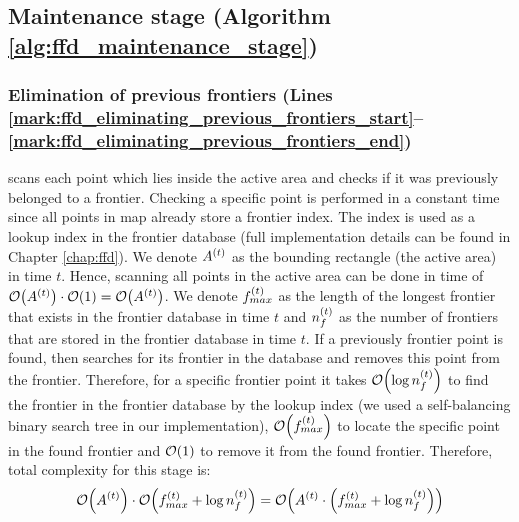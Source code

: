 \subsection{Maintenance stage (Algorithm \ref{alg:ffd_maintenance_stage})}
\subsubsection{Elimination of previous frontiers (Lines
\ref{mark:ffd_eliminating_previous_frontiers_start}--\ref{mark:ffd_eliminating_previous_frontiers_end})}
\FFD scans each point which lies inside the active area and checks if it was
previously belonged to a frontier. Checking a specific point is performed in a
constant time since all points in map already store a frontier index. The index
is used as a lookup index in the frontier database (full implementation details
can be found in Chapter \ref{chap:ffd}). We denote $A^{\left(t\right)}$ as the bounding
rectangle (the active area) in time $t$. Hence, scanning all points in the
active area can be done in time of $\mathcal{O}{\left(A^{\left(t\right)}\right)} \cdot \mathcal{O}{\left(1\right)} =
\mathcal{O}{\left(A^{\left(t\right)}\right)}$. We denote $f_{max}^{\left(t\right)}$ as the length of the
longest frontier that exists in the frontier database in time $t$ and
$n_f^{\left(t\right)}$ as the number of frontiers that are stored in the frontier
database in time $t$. If a previously frontier point is found, then \FFD
searches for its frontier in the database and removes this point from the
frontier. Therefore, for a specific frontier point it takes
$\mathcal{O}{\left(\log{n_f^{\left(t\right)}}\right)}$ to find the frontier in the frontier database by
the lookup index (we used a self-balancing binary search tree in our
implementation), $\mathcal{O}{\left(f_{max}^{\left(t\right)}\right)}$ to locate the specific point in
the found frontier and $\mathcal{O}{\left(1\right)}$ to remove it from the found frontier.
Therefore, total complexity for this stage is:
\begin{equation}\label{eq:elimination}
	\mathcal{O}{\left(A^{\left(t\right)}\right)} \cdot
    \mathcal{O}{\left(f_{max}^{\left(t\right)} +
        \log{n_f^{\left(t\right)}}\right)}
    =
    \mathcal{O}{\left(A^{\left(t\right)} \cdot
        \left(f_{max}^{\left(t\right)} +
        \log{n_f^{\left(t\right)}}\right)\right)} 
\end{equation}

